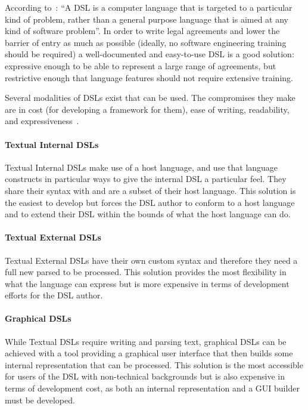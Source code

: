 According to~\cite{fowlerDsl}: ``A DSL is a computer language that is targeted to a particular kind of problem, rather than a general purpose language that is aimed at any kind of software problem''.
In order to write legal agreements and lower the barrier of entry as much as possible (ideally, no software engineering training should be required) a well-documented and easy-to-use DSL is a good solution: expressive enough to be able to represent a large range of agreements, but restrictive enough that language features should not require extensive training.

Several modalities of DSLs exist that can be used.
The compromises they make are in cost (for developing a framework for them), ease of writing, readability, and expressiveness~\cite{fowlerDslGuide, fowlerLangWorkbench}.

\paragraph{Textual Internal DSLs}

Textual Internal DSLs make use of a host language, and use that language constructs in particular ways to give the internal DSL a particular feel.
They share their syntax with and are a subset of their host language.
This solution is the easiest to develop but forces the DSL author to conform to a host language and to extend their DSL within the bounds of what the host language can do.

\paragraph{Textual External DSLs}

Textual External DSLs have their own custom syntax and therefore they need a full new parsed to be processed.
This solution provides the most flexibility in what the language can express but is more expensive in terms of development efforts for the DSL author.

\paragraph{Graphical DSLs}

While Textual DSLs require writing and parsing text, graphical DSLs can be achieved with a tool providing a graphical user interface that then builds some internal representation that can be processed.
This solution is the most accessible for users of the DSL with non-technical backgrounds but is also expensive in terms of development cost, as both an internal representation and a GUI builder must be developed.

